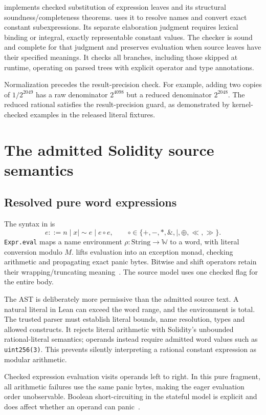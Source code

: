 \documentclass[conference]{IEEEtran}
\newcommand{\W}{\mathbb W}
\newcommand{\code}[1]{\texttt{#1}}
\begin{document}
 implements checked substitution of expression
leaves and its structural soundness/completeness theorems.
 uses it to resolve names and convert exact
constant subexpressions. Its separate elaboration judgment requires lexical
binding or integral, exactly representable constant values. The checker is
sound and complete for that judgment and preserves evaluation when source
leaves have their specified meanings. It checks all branches, including those
skipped at runtime, operating on parsed trees with explicit operator and type
annotations.

Normalization precedes the result-precision check. For example, adding two
copies of $1/2^{2049}$ has a raw denominator $2^{4098}$ but a reduced denominator
$2^{2048}$. The reduced rational satisfies the result-precision guard, as
demonstrated by kernel-checked examples in the released literal fixtures.

\section{The admitted Solidity source semantics}
\subsection{Resolved pure word expressions}
The syntax in  is
\[
 e ::= n\mid x\mid {\sim}e\mid e\mathbin{\circ}e,
 \qquad
 \circ\in\{+,-,*,\&,|,\mathbin{\oplus},\ll,\gg\}.
\]
\code{Expr.eval} maps a name environment $\rho:\mathrm{String}\to\W$ to a
word, with literal conversion modulo $M$.
 lifts evaluation into an exception monad,
checking arithmetic and propagating exact panic bytes. Bitwise and shift
operators retain their wrapping/truncating meaning~\cite{types}.
The source model uses one checked flag for the entire body.

The AST is deliberately more permissive than the admitted source text. A
natural literal in Lean can exceed the word range, and the environment is
total. The trusted parser must establish literal bounds, name resolution,
types and allowed constructs. It rejects literal arithmetic with Solidity's
unbounded rational-literal semantics; operands instead require admitted word
values such as \code{uint256(3)}. This prevents silently interpreting a
rational constant expression as modular arithmetic.

Checked expression evaluation visits operands left to right. In this pure
fragment, all arithmetic failures use the same panic bytes, making the eager
evaluation order unobservable. Boolean short-circuiting in the stateful model
is explicit and does affect whether an operand can panic~\cite{control}.
\end{document}
